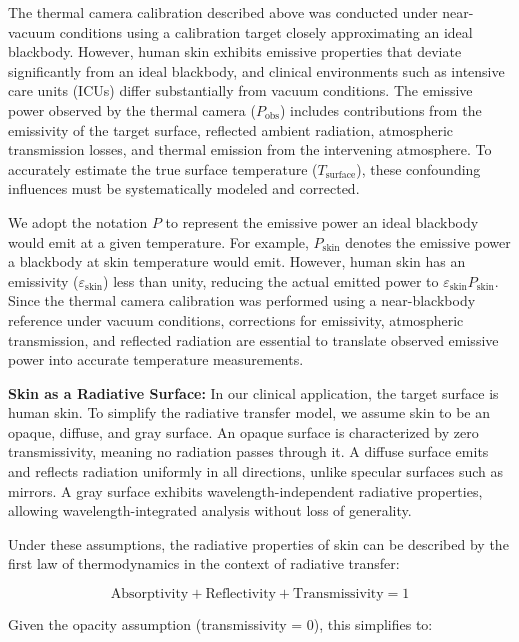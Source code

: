 The thermal camera calibration described above was conducted under near-vacuum conditions using a calibration target closely approximating an ideal blackbody. However, human skin exhibits emissive properties that deviate significantly from an ideal blackbody, and clinical environments such as intensive care units (ICUs) differ substantially from vacuum conditions. The emissive power observed by the thermal camera ($P_{\text{obs}}$) includes contributions from the emissivity of the target surface, reflected ambient radiation, atmospheric transmission losses, and thermal emission from the intervening atmosphere. To accurately estimate the true surface temperature ($T_{\text{surface}}$), these confounding influences must be systematically modeled and corrected.

We adopt the notation $P$ to represent the emissive power an ideal blackbody would emit at a given temperature. For example, $P_{\text{skin}}$ denotes the emissive power a blackbody at skin temperature would emit. However, human skin has an emissivity ($\varepsilon_{\text{skin}}$) less than unity, reducing the actual emitted power to $\varepsilon_{\text{skin}} P_{\text{skin}}$. Since the thermal camera calibration was performed using a near-blackbody reference under vacuum conditions, corrections for emissivity, atmospheric transmission, and reflected radiation are essential to translate observed emissive power into accurate temperature measurements.

\vspace{1ex}
\noindent \textbf{Skin as a Radiative Surface:} In our clinical application, the target surface is human skin. To simplify the radiative transfer model, we assume skin to be an opaque, diffuse, and gray surface. An opaque surface is characterized by zero transmissivity, meaning no radiation passes through it. A diffuse surface emits and reflects radiation uniformly in all directions, unlike specular surfaces such as mirrors. A gray surface exhibits wavelength-independent radiative properties, allowing wavelength-integrated analysis without loss of generality.

Under these assumptions, the radiative properties of skin can be described by the first law of thermodynamics in the context of radiative transfer:

\begin{equation}
  \text{Absorptivity} + \text{Reflectivity} + \text{Transmissivity} = 1
\end{equation}

Given the opacity assumption (transmissivity = 0), this simplifies to:

